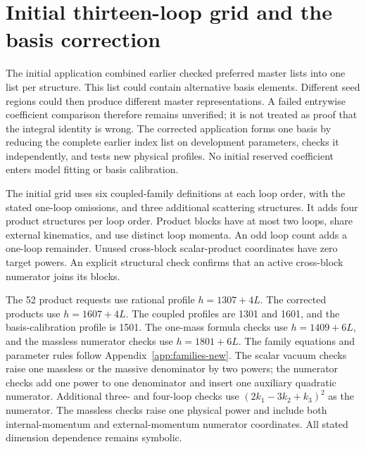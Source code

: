 \section{Initial thirteen-loop grid and the basis correction}
\label{sec:blocks13-initial}
The initial application combined earlier checked preferred master lists into one list per structure. This list could contain alternative basis elements. Different seed regions could then produce different master representations. A failed entrywise coefficient comparison therefore remains unverified; it is not treated as proof that the integral identity is wrong. The corrected application forms one basis by reducing the complete earlier index list on development parameters, checks it independently, and tests new physical profiles. No initial reserved coefficient enters model fitting or basis calibration.

The initial grid uses six coupled-family definitions at each loop order, with the stated one-loop omissions, and three additional scattering structures. It adds four product structures per loop order. Product blocks have at most two loops, share external kinematics, and use distinct loop momenta. An odd loop count adds a one-loop remainder. Unused cross-block scalar-product coordinates have zero target powers. An explicit structural check confirms that an active cross-block numerator joins its blocks.

The 52 product requests use rational profile $h=1307+4L$. The corrected products use $h=1607+4L$. The coupled profiles are 1301 and 1601, and the basis-calibration profile is 1501. The one-mass formula checks use $h=1409+6L$, and the massless numerator checks use $h=1801+6L$. The family equations and parameter rules follow Appendix~\ref{app:families-new}. The scalar vacuum checks raise one massless or the massive denominator by two powers; the numerator checks add one power to one denominator and insert one auxiliary quadratic numerator. Additional three- and four-loop checks use $(2k_1-3k_2+k_3)^2$ as the numerator. The massless checks raise one physical power and include both internal-momentum and external-momentum numerator coordinates. All stated dimension dependence remains symbolic.

